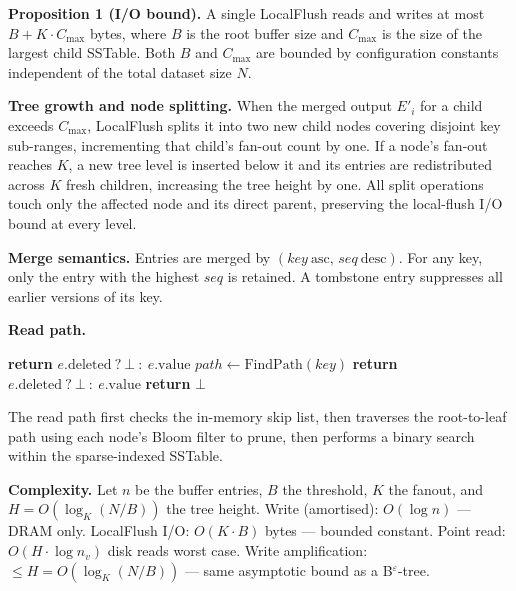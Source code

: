 \documentclass{jors}
\begin{document}
\textbf{Proposition 1 (I/O bound).} A single LocalFlush reads and writes
at most $B + K \cdot C_{\max}$ bytes, where $B$ is the root buffer size
and $C_{\max}$ is the size of the largest child SSTable. Both $B$ and
$C_{\max}$ are bounded by configuration constants independent of the
total dataset size $N$.

\textbf{Tree growth and node splitting.} When the merged output $E'_i$
for a child exceeds $C_{\max}$, LocalFlush splits it into two new child
nodes covering disjoint key sub-ranges, incrementing that child's fan-out
count by one. If a node's fan-out reaches $K$, a new tree level is
inserted below it and its entries are redistributed across $K$ fresh
children, increasing the tree height by one. All split operations touch
only the affected node and its direct parent, preserving the local-flush
I/O bound at every level.

\textbf{Merge semantics.} Entries are merged by $(\mathit{key}\
\mathrm{asc},\, \mathit{seq}\ \mathrm{desc})$. For any key, only the
entry with the highest $\mathit{seq}$ is retained. A tombstone entry
suppresses all earlier versions of its key.

\textbf{Read path.}

\begin{algorithm}[t]
\caption{Get($key$)}
\begin{algorithmic}[1]
  \State \textbf{return} $e.\mathrm{deleted}\ ?\ \bot\ :\ e.\mathrm{value}$
\EndIf
\State $\mathit{path} \gets \mathrm{FindPath}(key)$
      \State \textbf{return} $e.\mathrm{deleted}\ ?\ \bot\ :\ e.\mathrm{value}$
    \EndIf
  \EndIf
\EndFor
\State \textbf{return} $\bot$
\end{algorithmic}
\end{algorithm}

The read path first checks the in-memory skip list, then traverses the
root-to-leaf path using each node's Bloom filter to prune, then performs
a binary search within the sparse-indexed SSTable.

\textbf{Complexity.} Let $n$ be the buffer entries, $B$ the threshold,
$K$ the fanout, and $H = O(\log_K(N/B))$ the tree height.
Write (amortised): $O(\log n)$ — DRAM only.
LocalFlush I/O: $O(K \cdot B)$ bytes — bounded constant.
Point read: $O(H \cdot \log n_v)$ disk reads worst case.
Write amplification: $\leq H = O(\log_K(N/B))$ — same asymptotic bound
as a B$^\varepsilon$-tree.
\end{document}
